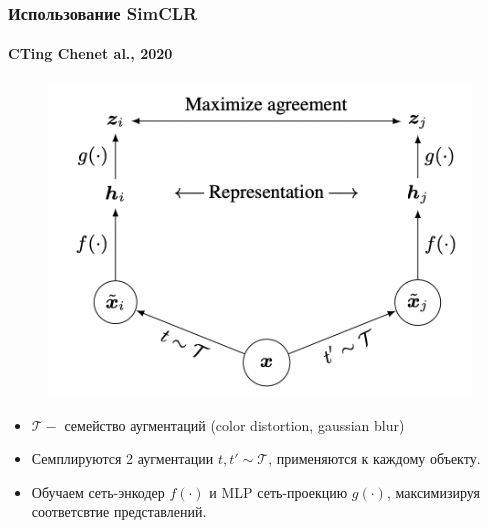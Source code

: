 \documentclass[
	11pt, %
]{beamer}
\begin{document}




\begin{frame}
	\frametitle{Использование SimCLR}
	\framesubtitle{CTing Chenet al., 2020} %

\begin{figure}
    \includegraphics[width=0.5\linewidth]{Images/simclr.png}
\end{figure}

\scriptsize
\begin{itemize}
    \item $\mathcal{T} -$ семейство аугментаций (color distortion, gaussian blur) 
    \item Семплируются 2 аугментации $t, t' \sim \mathcal{T}$, применяются к каждому объекту.
    \item Обучаем сеть-энкодер $f(\cdot)$ и MLP сеть-проекцию $g(\cdot)$, максимизируя соответсвтие представлений.
\end{itemize}
\end{frame}

\end{document}
